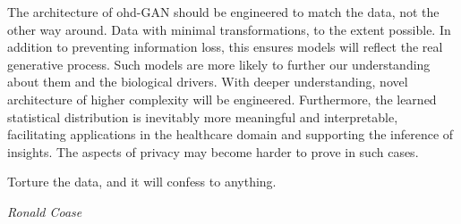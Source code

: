 \footnotesize
{}
\begin{tcolorbox}[
    arc=0mm, 
    colback=cadmiumgreen!10!white, 
    coltext=cadmiumgreen!90!black,  
    colframe=cadmiumgreen!90!black,
    colbacktitle=cadmiumgreen!80,
    leftrule=3mm,
    rightrule=0mm, 
    toprule=0mm, 
    bottomrule=0mm, 
    box align=top]
    
The architecture of \gls{ohd}-GAN should be engineered to match the data, not the other way around. Data with minimal transformations, to the extent possible. In addition to preventing information loss, this ensures models will reflect the real generative process. Such models are more likely to further our understanding about them and the biological drivers. With deeper understanding, novel architecture of higher complexity will be engineered. Furthermore, the learned statistical distribution is inevitably more meaningful and interpretable, facilitating applications in the healthcare domain and supporting the inference of insights. The aspects of privacy may become harder to prove in such cases.

\end{tcolorbox}
\hfill
\begin{tcolorbox}[tcbox width=auto, 
    arc=0mm, 
    colback=white, 
    coltext=cadmiumgreen, 
    boxrule=0pt, 
    colframe=white,
    box align=top]

\epigraph{Torture the data, and it will confess to anything.}{\textit{Ronald Coase}}

\end{tcolorbox}
\normalsize